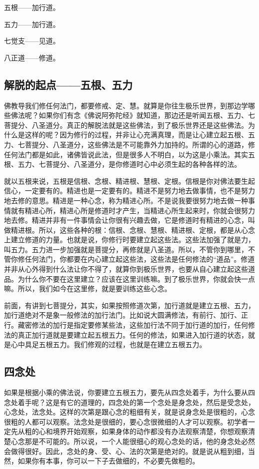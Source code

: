 \documentclass{book}
\begin{document}
五根——加行道。

五力——加行道。

七觉支——见道。

八正道——修道。

\subsection{解脱的起点——五根、五力}

佛教导我们修任何法门，都要修戒、定、慧。就算是你往生极乐世界，到那边学哪些佛法呢？如果你们有念《佛说阿弥陀经》就知道，那边还是听闻五根、五力、七菩提分、八圣道分。真正的解脱法就是这些佛法，到了极乐世界还是这些佛法。为什么是这样的呢？因为修行的过程，并非让心充满真理，而是让心建立起五根、五力、七菩提分、八圣道分，这些佛法是不可能靠外力加持的。所谓的心的道路，修任何法门都是如此，诸佛皆说此法，但是很多人不明白，以为这是小乘法。其实五根、五力、七菩提分、八圣道分，是你修道时心中必须生起的各种各样的法。

就以五根来说，五根是信根、念根、精进根、慧根、定根。信根是你对佛法要生起信心，一定要有的。精进也是一定要有的。精进不是努力地去做事情，也不是努力地去修的意思。精进是一种心念，称为精进心所。不是说我要很努力地去做一种事情就有精进心所，精进心所是修道时才产生，当精进心所生起来时，你就会很努力地去修。精进并非有一件事情会让你很有兴趣去做，它是修道时有精进的心念，叫做精进根。所以，这些各种的根：信根、念根、慧根、精进根、定根，都是从心念上建立修道的力量。也就是说，你修行时要建立起这些法。这些法加强了就是力，叫五力。五力进一步加强就是菩提分，再修就是八圣道。所以，不管你到哪里，不管你修任何法门，你都要在内心建立起这些法，这些法是任何修法的``道品''。修道并非从心外得到什么法让你不得了，就算你到极乐世界，也要从自心建立起这些道品。为什么你不要在这里建立？应该在这里训练嘛。到了极乐世界，你就会快一点嘛。所以，我们如今在这里修，就是要训练这些心念。

前面，有讲到七菩提分，其实，如果按照修道次第，加行道就是建立五根、五力，加行道绝对不是象一般修法的加行法门。比如说大圆满修法，有前行、加行、正行。藏密修法的加行是指定要修某些法，这些加行法不同于加行道的加行，任何修法的真正加行道就是要建立起五根五力。任何的修法，如果进入加行道的状态，就是心中具足五根五力。我们修观的过程，也就是在建立五根五力。

\subsection{四念处}

如果是根据小乘的佛法说，你要建立五根五力，要先从四念处着手，为什么要从四念处着手呢？这是有它的道理的，四念处的第一个念处是身念处，然后是受念处，心念处，法念处。这样的次第是跟心念的粗细有关，就是说身念处是很粗的，心念很粗的人都可以观察。法念处是很细的，要心念很微细的人才可以观察。初学者一定先从粗的心和境界开始观察，如果身体的动作都没有办法观察清楚，你想观察清楚心念那是不可能的。所以说，一个人能很细心的观心念处的话，他的身念处必然会做得很好。因此，念处的身、受、心、法的次第是绝对的。就是说从粗到细，当然，如果你有本事，你可以一下子去做细的，不必要先做粗的。
\end{document}
